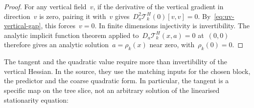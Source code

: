 \begin{proof}
For any vertical field~$v$, if the derivative of the vertical gradient in direction~$v$ is zero, pairing it with~$v$ gives~$D_a^2\mathcal T^H_k(0)[v,v]=0$. By~\eqref{eq:uv-vertical-gap}, this forces~$v=0$. In finite dimensions injectivity is invertibility. The analytic implicit function theorem applied to~$D_a\mathcal T^H_k(x,a)=0$ at~$(0,0)$ therefore gives an analytic solution~$a=\rho_k(x)$ near zero, with~$\rho_k(0)=0$.

\end{proof}

The tangent and the quadratic value require more than invertibility of the vertical Hessian. In the source, they use the matching inputs for the chosen block, the predictor and the coarse quadratic form. In particular, the tangent is a specific map on the tree slice, not an arbitrary solution of the linearised stationarity equation:

